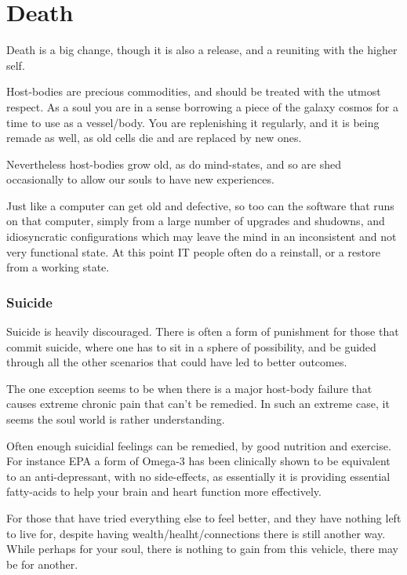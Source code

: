 \chapter{Death}

Death is a big change, though it is also a release, and a reuniting with the
higher self. 

Host-bodies are precious commodities, and should
be treated with the utmost respect. As a soul you are in a sense borrowing a
piece of the galaxy cosmos for a time to use as a vessel/body. You are
replenishing it regularly, and it is being remade as well, as old cells die and
are replaced by new ones. 

Nevertheless host-bodies grow old, as do mind-states, and so are shed
occasionally to allow our souls to have new experiences. 

Just like a computer can get old and defective, so too can the software that
runs on that computer,  simply from a large number of upgrades and shudowns, and
idiosyncratic configurations which may leave the mind in an inconsistent and not
very functional state. At this point IT people often do a reinstall, or a
restore from a working state. 

\subsection{Suicide}

Suicide is heavily discouraged. There is often a form of punishment for those
that commit suicide, where one has to sit in a sphere of possibility, and be
guided through all the other scenarios that could have led to better outcomes. 

The one exception seems to be when there is a major host-body failure that
causes extreme chronic pain that can't be remedied. In such an extreme case, it
seems the soul world is rather understanding. 

Often enough suicidial feelings can be remedied, by good nutrition and exercise. 
For instance EPA a form of Omega-3 has been clinically shown to be equivalent to
an anti-depressant, with no side-effects, as essentially it is providing
essential fatty-acids to help your brain and heart function more effectively. 

For those that have tried everything else to feel better, and they have nothing
left to live for, despite having wealth/healht/connections there is still 
another way. While perhaps for your soul, there is nothing to gain from this
vehicle, there may be for another.

